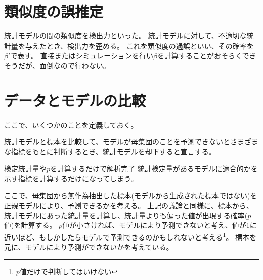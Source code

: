\section{類似度の誤推定}
統計モデルの間の類似度を検出力といった。
統計モデルに対して、不適切な統計量を与えたとき、検出力を歪める。
これを類似度の過誤といい、その確率を$\beta'$で表す。
直接またはシミュレーションを行い$\beta$を計算することがおそらくできそうだが、面倒なので行わない。



\section{データとモデルの比較}
ここで、いくつかのことを定義しておく。
\begin{defi}
    統計モデルと標本を比較して、モデルが母集団のことを予測できないとさまざまな指標をもとに判断するとき、統計モデルを却下すると宣言する。
\end{defi}

\begin{SMbox}{検定統計量や$p$を計算するだけで解析完了}
    統計検定量があるモデルに適合的かを示す指標を計算するだけになってしまう。
\end{SMbox}


ここで、母集団から無作為抽出した標本(モデルから生成された標本ではない)を正規モデルにより、予測できるかを考える。
上記の議論と同様に、標本から、統計モデルにあった統計量を計算し、統計量よりも偏った値が出現する確率($p$値)を計算する。
$p$値が小さければ、モデルにより予測できないと考え、値が1に近いほど、もしかしたらモデルで予測できるのかもしれないと考える\footnote{$p$値だけで判断してはいけない}。
標本を元に、モデルにより予測ができないかを考えている。

